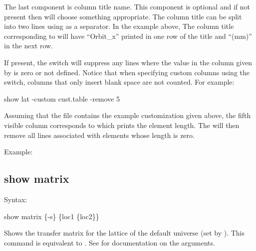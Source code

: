 {{{{{The last component is column title name. This component is optional and if not present
then \tao will choose something appropriate. The column title can be split into two lines
using  as a separator.  In the example above, The column title corresponding to
 will have ``Orbit_x'' printed in one row of the title and ``(mm)'' in
the next row.

If present, the  switch will suppress any lines where
the value in the column given by  is zero or not defined. Notice that when
specifying custom columns using the  switch, columns that only insert blank
space are not counted. For example:
\begin{example}
  show lat -custom cust.table -remove 5
\end{example}
Assuming that the file  contains the example customization given above, the
fifth visible column corresponds to  which prints the element length. The
 will then remove all lines associated with elements whose length is zero.

Example:


\subsection{show matrix}
\label{s:show.matrix}

Syntax:
\begin{example}
  show matrix \{-s\} \{loc1 \{loc2\}\}
\end{example}


Shows the transfer matrix for the  lattice of the default universe (set by
).  This command is equivalent to . See  for documentation on the  arguments.

}}}}}
